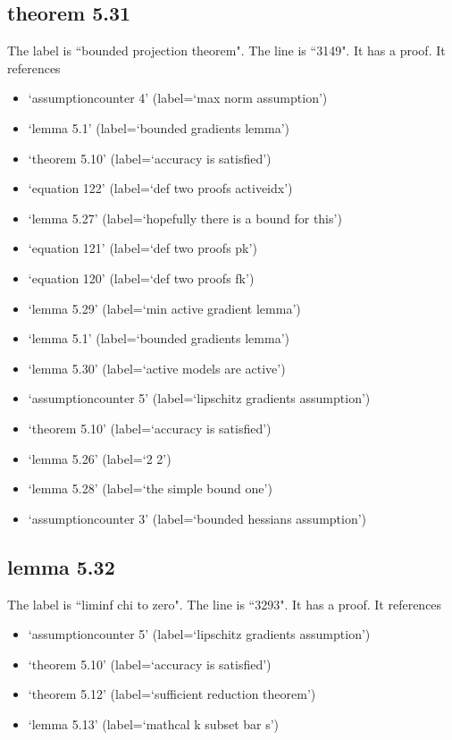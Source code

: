 \documentclass{article}
\begin{document}
\subsection{theorem 5.31}
The label is ``bounded projection theorem".
The line is ``3149".
It has a proof.
It references \begin{itemize}
\item `assumptioncounter 4' (label=`max norm assumption')
\item `lemma 5.1' (label=`bounded gradients lemma')
\item `theorem 5.10' (label=`accuracy is satisfied')
\item `equation 122' (label=`def two proofs activeidx')
\item `lemma 5.27' (label=`hopefully there is a bound for this')
\item `equation 121' (label=`def two proofs pk')
\item `equation 120' (label=`def two proofs fk')
\item `lemma 5.29' (label=`min active gradient lemma')
\item `lemma 5.1' (label=`bounded gradients lemma')
\item `lemma 5.30' (label=`active models are active')
\item `assumptioncounter 5' (label=`lipschitz gradients assumption')
\item `theorem 5.10' (label=`accuracy is satisfied')
\item `lemma 5.26' (label=`2 2')
\item `lemma 5.28' (label=`the simple bound one')
\item `assumptioncounter 3' (label=`bounded hessians assumption')
\end{itemize}
\subsection{lemma 5.32}
The label is ``liminf chi to zero".
The line is ``3293".
It has a proof.
It references \begin{itemize}
\item `assumptioncounter 5' (label=`lipschitz gradients assumption')
\item `theorem 5.10' (label=`accuracy is satisfied')
\item `theorem 5.12' (label=`sufficient reduction theorem')
\item `lemma 5.13' (label=`mathcal k subset bar s')
\end{itemize}
\end{document}
